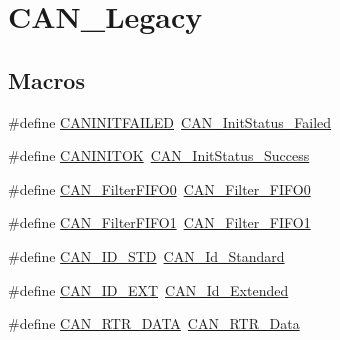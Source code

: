 \hypertarget{group___c_a_n___legacy}{}\section{C\+A\+N\+\_\+\+Legacy}
\label{group___c_a_n___legacy}
\subsection*{Macros}
\begin{DoxyCompactItemize}
\item 
\#define \mbox{\hyperlink{group___c_a_n___legacy_ga0539a9e5a898fcd71c4dcb7e341e4b86}{C\+A\+N\+I\+N\+I\+T\+F\+A\+I\+L\+ED}}~\mbox{\hyperlink{group___c_a_n__sleep__constants_ga095c319e8c54c974eb2b6eeadf180d96}{C\+A\+N\+\_\+\+Init\+Status\+\_\+\+Failed}}
\item 
\#define \mbox{\hyperlink{group___c_a_n___legacy_ga14cba0b5b506be73e2f45c732f8e54cb}{C\+A\+N\+I\+N\+I\+T\+OK}}~\mbox{\hyperlink{group___c_a_n__sleep__constants_ga6bed5957af8f2f6b00568e15ccac5772}{C\+A\+N\+\_\+\+Init\+Status\+\_\+\+Success}}
\item 
\#define \mbox{\hyperlink{group___c_a_n___legacy_ga1b3d041dff9fed4dad75ed2a4a0e27e0}{C\+A\+N\+\_\+\+Filter\+F\+I\+F\+O0}}~\mbox{\hyperlink{group___c_a_n__filter___f_i_f_o_ga8249c27978ca94676530540b88a6be8f}{C\+A\+N\+\_\+\+Filter\+\_\+\+F\+I\+F\+O0}}
\item 
\#define \mbox{\hyperlink{group___c_a_n___legacy_gada8f9b3a9c88f36539aaeb457039e666}{C\+A\+N\+\_\+\+Filter\+F\+I\+F\+O1}}~\mbox{\hyperlink{group___c_a_n__filter___f_i_f_o_gaab8478c89a607c4b8baf68efc730e316}{C\+A\+N\+\_\+\+Filter\+\_\+\+F\+I\+F\+O1}}
\item 
\#define \mbox{\hyperlink{group___c_a_n___legacy_ga284ca16658deb9d0c21f4ddc6db14833}{C\+A\+N\+\_\+\+I\+D\+\_\+\+S\+TD}}~\mbox{\hyperlink{group___c_a_n__identifier__type_ga151d9df8a6f361d0a3231593726b5a13}{C\+A\+N\+\_\+\+Id\+\_\+\+Standard}}
\item 
\#define \mbox{\hyperlink{group___c_a_n___legacy_ga5f6fdd1dc3d312af1ac30e2eee15d6f0}{C\+A\+N\+\_\+\+I\+D\+\_\+\+E\+XT}}~\mbox{\hyperlink{group___c_a_n__identifier__type_gaf6c5c0b43b968fed17fd90246912b1a7}{C\+A\+N\+\_\+\+Id\+\_\+\+Extended}}
\item 
\#define \mbox{\hyperlink{group___c_a_n___legacy_gab1e89074b4fcfebf81c323909625b0d0}{C\+A\+N\+\_\+\+R\+T\+R\+\_\+\+D\+A\+TA}}~\mbox{\hyperlink{group___c_a_n__remote__transmission__request_ga2407c3a8b2cd97bd651143aa959219f1}{C\+A\+N\+\_\+\+R\+T\+R\+\_\+\+Data}}

\end{DoxyCompactItemize}

